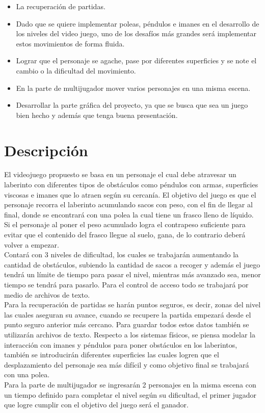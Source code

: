 \documentclass{report}   %
\begin{document}
\begin{itemize}
\item La recuperación de partidas.
\item	Dado que se quiere implementar poleas, péndulos e imanes en el desarrollo de los niveles del video juego, uno de los desafíos más grandes será implementar estos movimientos de forma fluida.
\item	Lograr que el personaje se agache, pase por diferentes superficies y se note el cambio o la dificultad del movimiento.
\item	En la parte de multijugador mover varios personajes en una misma escena.
\item	Desarrollar la parte gráfica del proyecto, ya que se busca que sea un juego bien hecho y además que tenga buena presentación.
\end{itemize}

\section{Descripción}
El videojuego propuesto se basa en un personaje el cual debe atravesar un laberinto con diferentes tipos de obstáculos como péndulos con armas, superficies viscosas e imanes que lo atraen según su cercanía.
El objetivo del juego es que el personaje recorra el laberinto acumulando sacos con peso, con el fin de llegar al final, donde se encontrará con una polea la cual tiene un frasco lleno de líquido. Si el personaje al poner el peso acumulado logra el contrapeso suficiente para evitar que el contenido del frasco llegue al suelo, gana, de lo contrario deberá volver a empezar.\\
Contará con 3 niveles de dificultad, los cuales se trabajarán aumentando la cantidad de obstáculos, subiendo la cantidad de sacos a recoger y además el juego tendrá un límite de tiempo para pasar el nivel, mientras más avanzado sea, menor tiempo se tendrá para pasarlo.
Para el control de acceso todo se trabajará por medio de archivos de texto. \\
Para la recuperación de partidas se harán puntos seguros, es decir, zonas del nivel las cuales aseguran su avance, cuando se recupere la partida empezará desde el punto seguro anterior más cercano. Para guardar todos estos datos también se utilizarán archivos de texto.
Respecto a los sistemas físicos, se piensa modelar la interacción con imanes y péndulos para poner obstáculos en los laberintos, también se introducirán diferentes superficies las cuales logren que el desplazamiento del personaje sea más difícil y como objetivo final se trabajará con una polea.\\
Para la parte de multijugador se ingresarán 2 personajes en la misma escena con un tiempo definido para completar el nivel según su dificultad, el primer jugador que logre cumplir con el objetivo del juego será el ganador.
\end{document}
